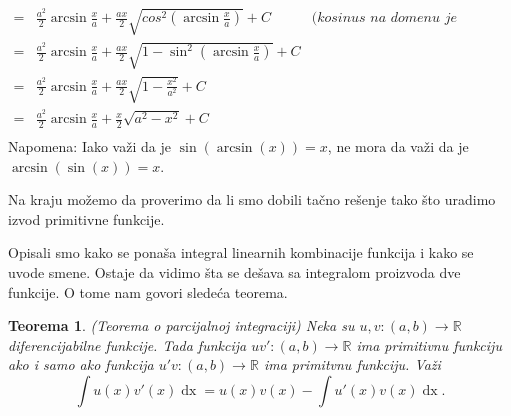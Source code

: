 \documentclass{article}
\newtheorem{teorema}{Teorema}[section]
\DeclareMathOperator{\dx}{dx}
\begin{document}
\begin{primbox}
\begin{align*}
        = & \frac{a^2}{2}\arcsin\frac{x}{a} + \frac{a x}{2}\sqrt{cos^2\left(\arcsin\frac{x}{a}\right)} + C                            & \textit{(kosinus na domenu je pozitivan)}           \\
        = & \frac{a^2}{2}\arcsin\frac{x}{a} + \frac{a x}{2}\sqrt{1-\sin^2\left(\arcsin\frac{x}{a}\right)} + C                         &                                                     \\
        = & \frac{a^2}{2}\arcsin\frac{x}{a} + \frac{a x}{2}\sqrt{1-\frac{x^2}{a^2}} + C                                               &                                                     \\
        = & \frac{a^2}{2}\arcsin\frac{x}{a} + \frac{x}{2}\sqrt{a^2-x^2} + C                                                           &                                                     \\
    \end{align*}
    \label{napomena_1_primer_1.9}Napomena: Iako važi da je $\sin\left(\arcsin\left(x\right)\right)=x$, ne mora da važi da je $\arcsin\left(\sin\left(x\right)\right)=x$.\par
    Na kraju možemo da proverimo da li smo dobili tačno rešenje tako što uradimo izvod primitivne funkcije.
\end{primbox}

Opisali smo kako se ponaša integral linearnih kombinacije funkcija i kako se uvode smene. Ostaje da vidimo
šta se dešava sa integralom proizvoda dve funkcije. O tome nam govori sledeća teorema.

\begin{teoremabox}
    \label{teorema_1.4}
    \begin{teorema}
        (Teorema o parcijalnoj integraciji) Neka su
        $u, v: \left(a, b\right) \longrightarrow \mathbb{R}$ diferencijabilne
        funkcije. Tada funkcija $u v':\left(a, b\right) \longrightarrow \mathbb{R}$
        ima primitivnu funkciju ako i samo ako funkcija $u' v: \left(a, b\right) \longrightarrow \mathbb{R}$
        ima primitvnu funkciju. Važi
        $$\int u\left(x\right)v'\left(x\right)\dx = u\left(x\right)v\left(x\right) -\int u'\left(x\right)v\left(x\right)\dx.$$
    \end{teorema}
\end{teoremabox}
\end{document}
